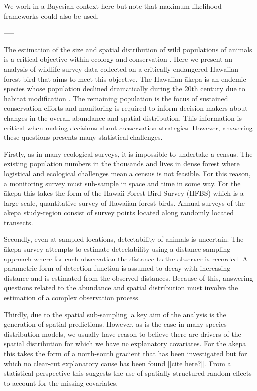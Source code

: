 \documentclass[preprint,12pt]{elsarticle}
\newcommand{\akepa}{\textquotesingle\={a}kepa}  %
\begin{document}
We work in a Bayesian context here but note that maximum-likelihood frameworks could also be used.

-----


The estimation of the size and spatial distribution of wild populations of animals is a critical objective within ecology and conservation \citep{schwarz_estimating_1999}. Here we present an analysis of wildlife survey data collected on a critically endangered Hawaiian forest bird that aims to meet this objective.  The Hawaiian \akepa{} is an endemic species whose population declined dramatically during the 20th century due to habitat modification \citep{scott_HFBS_1986, pratt_avifaunal_1994}.  The remaining population is the focus of sustained conservation efforts and monitoring is required to inform decision-makers about changes in the overall abundance and spatial distribution.  This information is critical when making decisions about conservation strategies.  However, answering these questions presents many statistical challenges.  

Firstly, as in many ecological surveys, it is impossible to undertake a census.  The existing population numbers in the thousands and lives in dense forest where logistical and ecological challenges mean a census is not feasible.  For this reason, a monitoring survey must sub-sample in space and time in some way.  For the \akepa{} this takes the form of the Hawaii Forest Bird Survey (HFBS) \citep{scott_HFBS_1986} which is a large-scale, quantitative survey of Hawaiian forest birds.  Annual surveys of the \akepa{} study-region consist of survey points located along randomly located transects.    

Secondly, even at sampled locations, detectability of animals is uncertain.  The \akepa{} survey attempts to estimate detectability using a distance sampling approach \citep{buckland_distance_2015} where for each observation the distance to the observer is recorded.  A parametric form of detection function is assumed to decay with increasing distance and is estimated from the observed distances.  Because of this, answering questions related to the abundance and spatial distribution must involve the estimation of a complex observation process.  

Thirdly, due to the spatial sub-sampling, a key aim of the analysis is the generation of spatial predictions.  However, as is the case in many species distribution models, we usually have reason to believe there are drivers of the spatial distribution for which we have no explanatory covariates.  For the \akepa{} this takes the form of a north-south gradient that has been investigated but for which no clear-cut explanatory cause has been found [[cite here?]].  From a statistical perspective this suggests the use of spatially-structured random effects to account for the missing covariates.
\end{document}
